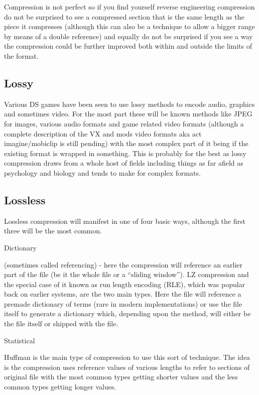 \documentclass[
]{book}
\begin{document}
Compression is not perfect so if you find yourself reverse engineering compression do not be surprised to see a compressed section that is the same length as the piece it compresses (although this can also be a technique to allow a bigger range by means of a double reference) and equally do not be surprised if you see a way the compression could be further improved both within and outside the limits of the format.

\hypertarget{lossy}{%
\subsection{Lossy}\label{lossy}}

Various DS games have been seen to use lossy methods to encode audio, graphics and sometimes video. For the most part these will be known methods like JPEG for images, various audio formats and game related video formats (although a complete description of the VX and mods video formats aka act imagine/mobiclip is still pending) with the most complex part of it being if the existing format is wrapped in something. This is probably for the best as lossy compression draws from a whole host of fields including things as far afield as psychology and biology and tends to make for complex formats.

\hypertarget{lossless}{%
\subsection{Lossless}\label{lossless}}

Lossless compression will manifest in one of four basic ways, although the first three will be the most common.

Dictionary

(sometimes called referencing) - here the compression will reference an earlier part of the file (be it the whole file or a ``sliding window''). LZ compression and the special case of it known as run length encoding (RLE), which was popular back on earlier systems, are the two main types. Here the file will reference a premade dictionary of terms (rare in modern implementations) or use the file itself to generate a dictionary which, depending upon the method, will either be the file itself or shipped with the file.

Statistical

Huffman is the main type of compression to use this sort of technique. The idea is the compression uses reference values of various lengths to refer to sections of original file with the most common types getting shorter values and the less common types getting longer values.
\end{document}
